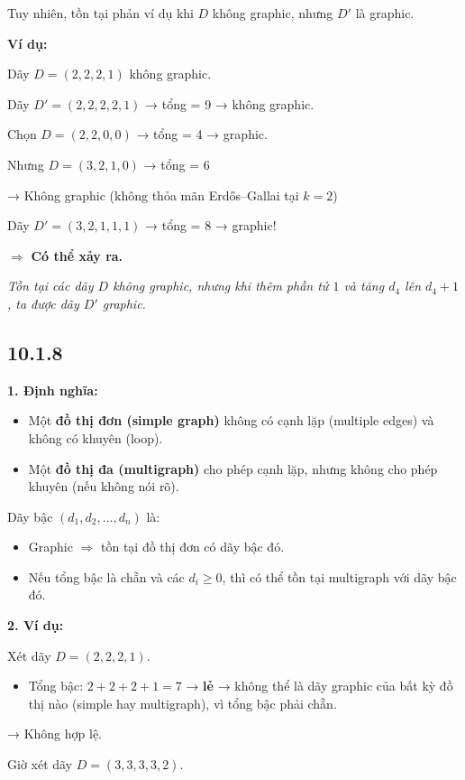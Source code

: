 \documentclass{article}
\begin{document}
	Tuy nhiên, tồn tại phản ví dụ khi $D$ không graphic, nhưng $D'$ là graphic.
	
	\textbf{Ví dụ:}
	
	Dãy $D = (2,2,2,1)$ không graphic.
	
	Dãy $D' = (2,2,2,2,1)$ → tổng = 9 → không graphic.
	
	Chọn $D = (2,2,0,0)$ → tổng = 4 → graphic.
	
	Nhưng $D = (3,2,1,0)$ → tổng = 6
	
	→ Không graphic (không thỏa mãn Erdős–Gallai tại $k=2$)
	
	Dãy $D' = (3,2,1,1,1)$ → tổng = 8 → graphic!
	
	$\Rightarrow$ \textbf{Có thể xảy ra.}
	
	\textit{Tồn tại các dãy $D$ không graphic, nhưng khi thêm phần tử $1$ và tăng $d_4$ lên $d_4 + 1$, ta được dãy $D'$ graphic.}
	
	\subsection*{10.1.8}
	\textbf{1. Định nghĩa:}
	\begin{itemize}
		\item Một \textbf{đồ thị đơn (simple graph)} không có cạnh lặp (multiple edges) và không có khuyên (loop).
		\item Một \textbf{đồ thị đa (multigraph)} cho phép cạnh lặp, nhưng không cho phép khuyên (nếu không nói rõ).
	\end{itemize}
	
	Dãy bậc $(d_1, d_2, \dots, d_n)$ là:
	\begin{itemize}
		\item Graphic $\Rightarrow$ tồn tại đồ thị đơn có dãy bậc đó.
		\item Nếu tổng bậc là chẵn và các $d_i \geq 0$, thì có thể tồn tại multigraph với dãy bậc đó.
	\end{itemize}
	
	\textbf{2. Ví dụ:}
	
	Xét dãy $D = (2,2,2,1)$.
	
	\begin{itemize}
		\item Tổng bậc: $2 + 2 + 2 + 1 = 7$ → \textbf{lẻ} → không thể là dãy graphic của bất kỳ đồ thị nào (simple hay multigraph), vì tổng bậc phải chẵn.
	\end{itemize}
	
	→ Không hợp lệ.
	
	Giờ xét dãy $D = (3,3,3,3,2)$.
	
\end{document}
